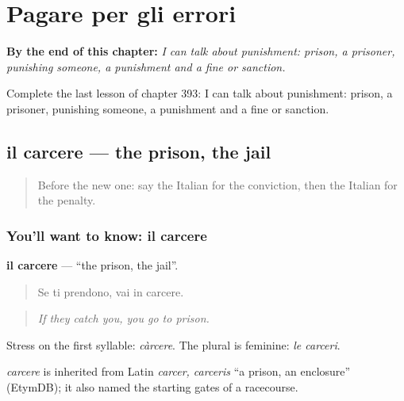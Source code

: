 
\chapter{Pagare per gli errori}
\label{ch:it-pagare-per-gli-errori}

\begin{chapteropening}
\textbf{By the end of this chapter:} \emph{I can talk about punishment: prison, a prisoner, punishing someone, a punishment and a fine or sanction.}

Complete the last lesson of chapter 393: I can talk about punishment: prison, a prisoner, punishing someone, a punishment and a fine or sanction.
\end{chapteropening}

\section[il carcere]{il carcere — the prison, the jail}

\label{lesson:IT-C393-carcere}



\begin{quote}
Before the new one: say the Italian for the conviction, then the Italian for the penalty.
\end{quote}

\subsection*{You'll want to know: il carcere}
\textbf{il carcere} — \textquotedblleft{}the prison, the jail\textquotedblright{}.

\begin{quote}
Se ti prendono, vai in carcere.
\end{quote}

\begin{quote}
\emph{If they catch you, you go to prison.}
\end{quote}

Stress on the first syllable: \emph{càrcere}. The plural is feminine: \emph{le carceri}.

\begin{cousinweb}
\emph{carcere} is inherited from Latin \emph{carcer, carceris} \textquotedblleft{}a prison, an enclosure\textquotedblright{} (EtymDB); it also named the starting gates of a racecourse.
\end{cousinweb}

